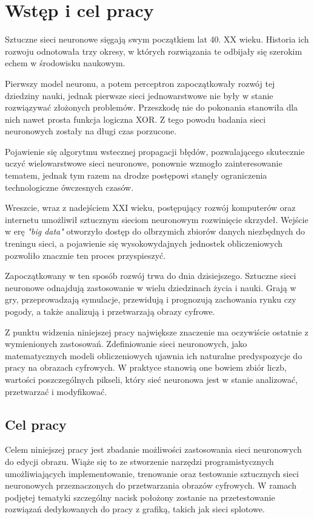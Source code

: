 \section{Wstęp i cel pracy}

  Sztuczne sieci neuronowe sięgają swym początkiem lat 40. XX wieku.
  Historia ich rozwoju odnotowała trzy okresy, w których rozwiązania te
  odbijały się szerokim echem w środowisku naukowym.

  Pierwszy model neuronu, a potem perceptron zapoczątkowały
  rozwój tej dziedziny nauki, jednak pierwsze sieci jednowarstwowe nie były w
  stanie rozwiązywać złożonych problemów. Przeszkodę nie do pokonania stanowiła
  dla nich nawet prosta funkcja logiczna XOR. Z tego powodu badania sieci
  neuronowych zostały na długi czas porzucone.

  Pojawienie się algorytmu wstecznej propagacji błędów,
  pozwalającego skutecznie uczyć wielowarstwowe sieci neuronowe, ponownie
  wzmogło zainteresowanie tematem, jednak tym razem na drodze postępowi stanęły
  ograniczenia technologiczne ówczesnych czasów.

  Wreszcie, wraz z nadejściem XXI wieku, postępujący rozwój
  komputerów oraz internetu umożliwił sztucznym sieciom neuronowym rozwinięcie
  skrzydeł. Wejście w erę \textit{"big data"} otworzyło dostęp do olbrzymich zbiorów
  danych niezbędnych do treningu sieci, a pojawienie się wysokowydajnych
  jednostek obliczeniowych pozwoliło znacznie ten proces przyspieszyć.

  Zapoczątkowany w ten sposób rozwój trwa do dnia dzisiejszego.
  Sztuczne sieci neuronowe odnajdują zastosowanie w wielu dziedzinach życia i
  nauki. Grają w gry, przeprowadzają symulacje, przewidują i prognozują
  zachowania rynku czy pogody, a także analizują i przetwarzają obrazy cyfrowe.

  Z punktu widzenia niniejszej pracy największe znaczenie ma
  oczywiście ostatnie z wymienionych zastosowań. Zdefiniowanie sieci neuronowych,
  jako matematycznych modeli obliczeniowych ujawnia ich naturalne predyspozycje
  do pracy na obrazach cyfrowych. W praktyce stanowią one bowiem zbiór liczb,
  wartości poszczególnych pikseli, który sieć neuronowa jest w stanie
  analizować, przetwarzać i modyfikować.

  \subsection{Cel pracy}

    Celem niniejszej pracy jest zbadanie możliwości zastosowania sieci neuronowych
    do edycji obrazu. Wiąże się to ze stworzenie narzędzi programistycznych
    umożliwiających implementowanie, trenowanie oraz testowanie sztucznych sieci
    neuronowych przeznaczonych do przetwarzania
    obrazów cyfrowych. W ramach podjętej tematyki szczególny nacisk położony
    zostanie na przetestowanie rozwiązań dedykowanych do pracy z grafiką, takich jak
    sieci splotowe.

